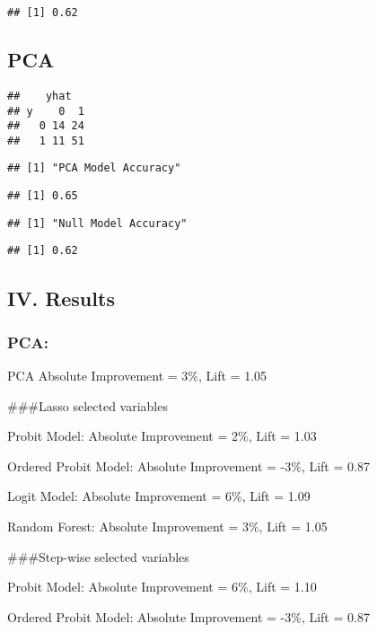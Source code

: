 \documentclass[
]{article}
\begin{document}
\begin{verbatim}
## [1] 0.62
\end{verbatim}

\hypertarget{pca}{%
\subsection{PCA}\label{pca}}

\begin{verbatim}
##    yhat
## y    0  1
##   0 14 24
##   1 11 51
\end{verbatim}

\begin{verbatim}
## [1] "PCA Model Accuracy"
\end{verbatim}

\begin{verbatim}
## [1] 0.65
\end{verbatim}

\begin{verbatim}
## [1] "Null Model Accuracy"
\end{verbatim}

\begin{verbatim}
## [1] 0.62
\end{verbatim}

\hypertarget{iv.-results}{%
\subsection{IV. Results}\label{iv.-results}}

\hypertarget{pca-1}{%
\subsubsection{PCA:}\label{pca-1}}

PCA Absolute Improvement = 3\%, Lift = 1.05

\#\#\#Lasso selected variables

Probit Model: Absolute Improvement = 2\%, Lift = 1.03

Ordered Probit Model: Absolute Improvement = -3\%, Lift = 0.87

Logit Model: Absolute Improvement = 6\%, Lift = 1.09

Random Forest: Absolute Improvement = 3\%, Lift = 1.05

\#\#\#Step-wise selected variables

Probit Model: Absolute Improvement = 6\%, Lift = 1.10

Ordered Probit Model: Absolute Improvement = -3\%, Lift = 0.87
\end{document}
